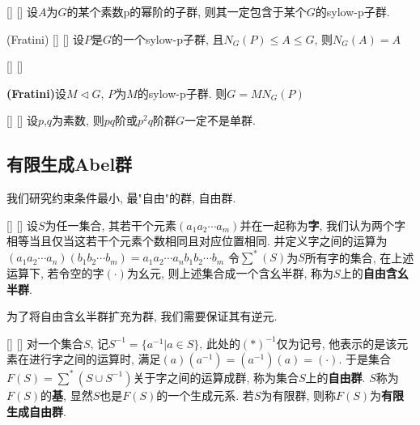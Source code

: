 \documentclass[UTF8]{ctexart}
\begin{document}
        \begin{ppt}
            []
            {}
            []
            []
            设$A$为$G$的某个素数p的幂阶的子群, 则其一定包含于某个$G$的sylow-p子群.
       \end{ppt}

        \begin{ppt}
            []
            {(Fratini)}
            []
            []
            设$P$是$G$的一个sylow-p子群, 且$N_G(P)\leq A \leq G$, 则$N_G(A)=A$
        \end{ppt}

        \begin{thm}
            []
            {}
            []
            []
        
            \textbf{(Fratini)}设$M\triangleleft G$, $P$为$M$的sylow-p子群. 则$G=MN_G(P)$
       \end{thm}

        \begin{crl}
            []
            {}
            []
            []
            设$p$,$q$为素数, 则$pq$阶或$p^2q$阶群$G$一定不是单群.
       \end{crl}

        

        
	\subsection{有限生成Abel群}
	我们研究约束条件最小, 最"自由"的群, 自由群.

        \begin{dfn}
            []
            {}
            []
            []
            设$S$为任一集合, 其若干个元素$(a_1a_2\cdots a_m)$并在一起称为\textbf{字}, 
            我们认为两个字相等当且仅当这若干个元素个数相同且对应位置相同.
            并定义字之间的运算为
            $(a_1a_2\cdots a_n)(b_1b_2\cdots b_m)=a_1a_2\cdots a_nb_1b_2\cdots b_m$
            令$\sum^{*}(S)$为$S$所有字的集合, 在上述运算下, 若令空的字$(\cdot)$为幺元,  
            则上述集合成一个含幺半群, 称为$S$上的\textbf{自由含幺半群}.
       \end{dfn}

        为了将自由含幺半群扩充为群, 我们需要保证其有逆元. 

        \begin{dfn}
            []
            {}
            []
            []
            对一个集合$S$, 记$S^{-1}=\{a^{-1}|a\in S\}$, 此处的$(*)^{-1}$仅为记号, 
            他表示的是该元素在进行字之间的运算时, 满足$(a)(a^{-1})=(a^{-1})(a)=(\cdot)$. 
            于是集合$F(S)=\sum^{*}(S\cup S^{-1})$关于字之间的运算成群, 称为集合$S$上的\textbf{自由群}. 
            $S$称为$F(S)$的\textbf{基}, 显然$S$也是$F(S)$的一个生成元系.
            若$S$为有限群, 则称$F(S)$为\textbf{有限生成自由群}.
       \end{dfn}
\end{document}
